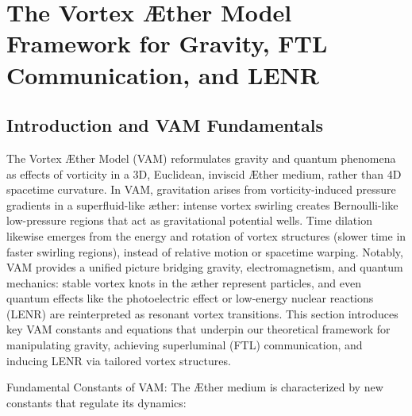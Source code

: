 \chapter*{The Vortex Æther Model Framework for Gravity, FTL Communication, and LENR}

\section*{Introduction and VAM Fundamentals}

The Vortex Æther Model (VAM) reformulates gravity and quantum phenomena as effects of vorticity in a 3D, Euclidean, inviscid Æther medium, rather than 4D spacetime curvature. In VAM, gravitation arises from vorticity-induced pressure gradients in a superfluid-like æther: intense vortex swirling creates Bernoulli-like low-pressure regions that act as gravitational potential wells. Time dilation likewise emerges from the energy and rotation of vortex structures (slower time in faster swirling regions), instead of relative motion or spacetime warping. Notably, VAM provides a unified picture bridging gravity, electromagnetism, and quantum mechanics: stable vortex knots in the æther represent particles, and even quantum effects like the photoelectric effect or low-energy nuclear reactions (LENR) are reinterpreted as resonant vortex transitions. This section introduces key VAM constants and equations that underpin our theoretical framework for manipulating gravity, achieving superluminal (FTL) communication, and inducing LENR via tailored vortex structures.


Fundamental Constants of VAM: The Æther medium is characterized by new constants that regulate its dynamics:


